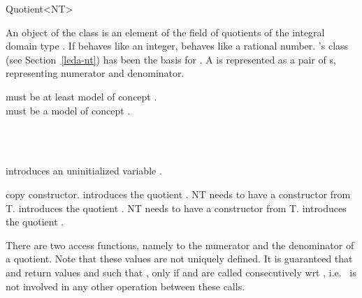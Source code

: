 
\begin{ccRefClass} {Quotient<NT>}
\label{Quotient}

\ccDefinition
An object of the class  is an element of the 
field of quotients of the integral domain type .
If  behaves like an integer, 
behaves like a rational number. 
{\leda}'s class  (see Section~\ref{leda-nt})
has been the basis for .
A   is represented as a pair of 
s, representing numerator and denominator.

 must be at least model of concept .\\
 must be a model of concept . \\



\ccIsModel

\\
\\

\ccCreation
{}

             {introduces an uninitialized variable \ccVar.}

\ccHidden {}
 	    {copy constructor.}
\ccGlue
{}
{introduces the quotient . NT needs to have a constructor from T.}
\ccGlue
{}
{introduces the quotient .
NT needs to have a constructor from T.}
\ccGlue
{}
            {introduces the quotient .\\
                     }


\ccOperations


There are two access functions, namely to the
numerator and the denominator of a quotient.
Note that these values are not uniquely defined. 
It is guaranteed that  and 
 return values  and
 such that , only
if   and  are called
consecutively wrt , i.e.~ is not involved in 
any other operation between these calls.


\end{ccRefClass}
